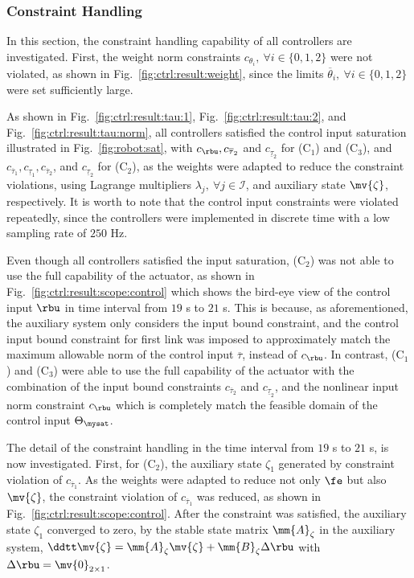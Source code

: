 \documentclass[lettersize,journal]{IEEEtran}
\begin{document}
\subsubsection{Constraint Handling} \label{sec:sim:constraint}

In this section, the constraint handling capability of all controllers are investigated.
First, the weight norm constraints $c_{\theta_i},\ \forall i\in\{0,1,2\}$ were not violated, as shown in Fig.~\ref{fig:ctrl:result:weight}, since the limits $\overline{\theta}_i,\ \forall i\in\{0,1,2\}$ were set sufficiently large.

As shown in Fig.~\ref{fig:ctrl:result:tau:1}, Fig.~\ref{fig:ctrl:result:tau:2}, and Fig.~\ref{fig:ctrl:result:tau:norm}, all controllers satisfied the control input saturation illustrated in Fig.~\ref{fig:robot:sat}, with $c_{\rbu},c_{\overline\tau_2}$ and $c_{\underline\tau_2}$ for (C$_1$) and (C$_3$), and $c_{\overline\tau_1},c_{\underline\tau_1},c_{\overline\tau_2}$, and $c_{\underline\tau_2}$ for (C$_2$), as the weights were adapted to reduce the constraint violations, using Lagrange multipliers $\lambda_j,\ \forall j\in\mathcal{I}$, and auxiliary state $\mv{\zeta}$, respectively.
It is worth to note that the control input constraints were violated repeatedly, since the controllers were implemented in discrete time with a low sampling rate of $250$ Hz.

\hfill

Even though all controllers satisfied the input saturation, (C$_2$) was not able to use the full capability of the actuator, as shown in Fig.~\ref{fig:ctrl:result:scope:control} which shows the bird-eye view of the control input $\rbu$ in time interval from $19$ s to $21$ s.
This is because, as aforementioned, the auxiliary system only considers the input bound constraint, and the control input bound constraint for first link was imposed to approximately match the maximum allowable norm of the control input $\overline\tau$, instead of $c_{\rbu}$.
In contrast, (C$_1$) and (C$_3$) were able to use the full capability of the actuator with the combination of the input bound constraints $c_{\overline\tau_2}$ and $c_{\underline\tau_2}$, and the nonlinear input norm constraint $c_{\rbu}$ which is completely match the feasible domain of the control input $\Theta_{\mysat}$.

\hfill

The detail of the constraint handling in the time interval from $19$ s to $21$ s, is now investigated.
First, for (C$_2$), the auxiliary state $\zeta_1$ generated by constraint violation of $c_{\overline\tau_1}$. 
As the weights were adapted to reduce not only $\fe$ but also $\mv{\zeta}$, the constraint violation of $c_{\overline\tau_1}$ was reduced, as shown in Fig.~\ref{fig:ctrl:result:scope:control}.
After the constraint was satisfied, the auxiliary state $\zeta_1$ converged to zero, by the stable state matrix $\mm{A}_\zeta$ in the auxiliary system, \ie $\ddtt\mv{\zeta} = \mm{A}_\zeta \mv{\zeta} + \mm{B}_\zeta \Delta\rbu$ with $\Delta\rbu=\mv{0}_{2\times1}$.
\end{document}
